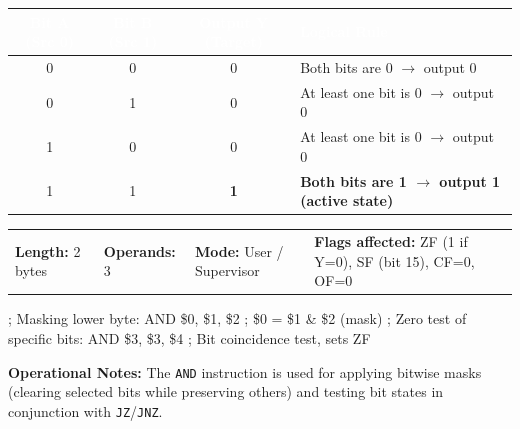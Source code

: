 \documentclass[11pt,a4paper]{article}
\newcommand{\reg}{\$}
\renewcommand{\arraystretch}{1.25}
\begin{document}
\vspace{0.5mm}
\par\vspace{0.8mm}
\noindent
{\footnotesize\renewcommand{\arraystretch}{1.1}%
\begin{tabularx}{\textwidth}{@{} c c c X @{}}
\toprule
\rowcolor{limslate}
\textcolor{white}{\textbf{Bit A (Src 0)}} & \textcolor{white}{\textbf{Bit B (Src 1)}} & \textcolor{white}{\textbf{Output Y (Target)}} & \textcolor{white}{\textbf{Logical Rule}} \\
\midrule
0 & 0 & 0 & Both bits are 0 $\rightarrow$ output 0 \\
\rowcolor{limroweven}
0 & 1 & 0 & At least one bit is 0 $\rightarrow$ output 0 \\
1 & 0 & 0 & At least one bit is 0 $\rightarrow$ output 0 \\
\rowcolor{limorangelight}
1 & 1 & \textbf{1} & \textbf{Both bits are 1 $\rightarrow$ output 1 (active state)} \\
\bottomrule
\end{tabularx}%
}
\vspace{1mm}

\begin{tcolorbox}[
    enhanced,
    colback=limcard,
    colframe=limborder,
    boxrule=0.6pt,
    arc=3pt,
    left=8pt,right=8pt,top=4pt,bottom=4pt
]
    \footnotesize
    \noindent
    \begin{tabularx}{\textwidth}{@{}l l l X@{}}
        \textbf{Length:} 2 bytes &
        \textbf{Operands:} 3 &
        \textbf{Mode:} User / Supervisor &
        \textbf{Flags affected:} ZF (1 if Y=0), SF (bit 15), CF=0, OF=0
    \end{tabularx}
\end{tcolorbox}

\begin{examplebox}[title={Usage Example (LIM2 Assembly)},top=4pt,bottom=4pt]
\begin{limasm}
; Masking lower byte:
AND \reg0, \reg1, \reg2     ; \reg0 = \reg1 & \reg2 (mask)
; Zero test of specific bits:
AND \reg3, \reg3, \reg4     ; Bit coincidence test, sets ZF
\end{limasm}
\vspace{1mm}
\footnotesize\color{limmuted}
\textbf{Operational Notes:} The \texttt{AND} instruction is used for applying bitwise masks (clearing selected bits while preserving others) and testing bit states in conjunction with \texttt{JZ}/\texttt{JNZ}.
\end{examplebox}
\end{document}
